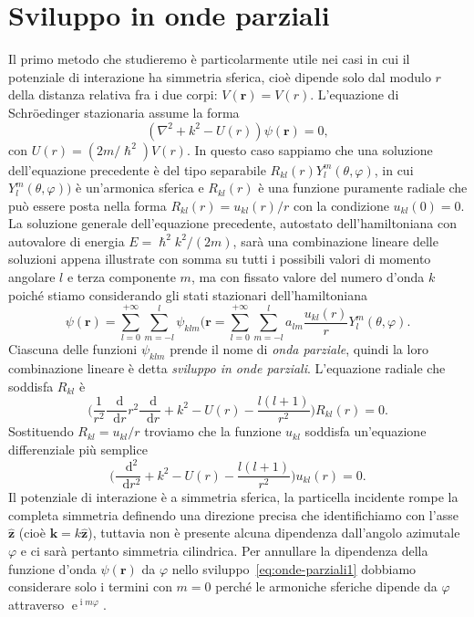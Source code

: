 \documentclass[a4paper,fleqn,twoside,12pt]{article}
\renewcommand{\phi}{\varphi}
\newcommand*{\dd}{\mathop{}\!\mathrm{d}} %
\DeclareMathOperator{\e}{\mathrm{e}} %
\DeclareMathOperator{\uimm}{\mathrm{i}} %
\newcommand*{\toder}[3][]{\frac{{\dd^{#1}}#2}{\dd {#3}^{#1}}}
\newcommand*{\versor}[1]{\hat{\bm{#1}}}
\begin{document}
\section{Sviluppo in onde parziali}
\label{sec:onde-parziali}

Il primo metodo che studieremo è particolarmente utile nei casi in cui il
potenziale di interazione ha simmetria sferica, cioè dipende solo dal modulo $r$
della distanza relativa fra i due corpi: $V(\bm{r}) = V(r)$.  L'equazione di
Schröedinger stazionaria assume la forma
\begin{equation}
  (\nabla^{2} + k^{2} - U(r)) \psi(\bm{r}) = 0,
\end{equation}
con $U(r) = (2m/\hslash^{2})V(r)$.  In questo caso sappiamo che una soluzione
dell'equazione precedente è del tipo separabile
$R_{kl}(r)Y_{l}^{m}(\theta,\phi)$, in cui $Y_{l}^{m}(\theta,\phi))$ è
un'armonica sferica e $R_{kl}(r)$ è una funzione puramente radiale che può
essere posta nella forma $R_{kl}(r) = u_{kl}(r)/r$ con la condizione
$u_{kl}(0) = 0$.  La soluzione generale dell'equazione precedente, autostato
dell'hamiltoniana con autovalore di energia $E = \hslash^{2}k^{2}/(2m)$, sarà
una combinazione lineare delle soluzioni appena illustrate con somma su tutti i
possibili valori di momento angolare $l$ e terza componente $m$, ma con fissato
valore del numero d'onda $k$ poiché stiamo considerando gli stati stazionari
dell'hamiltoniana
\begin{equation}
  \label{eq:onde-parziali1}
  \psi(\bm{r}) = \sum_{l = 0}^{+\infty} \sum_{m = -l}^{l} \psi_{klm}(\bm{r} =
  \sum_{l = 0}^{+\infty} \sum_{m = -l}^{l} a_{lm}
  \frac{u_{kl}(r)}{r}Y_{l}^{m}(\theta,\phi).
\end{equation}
Ciascuna delle funzioni $\psi_{klm}$ prende il nome di \emph{onda parziale},
quindi la loro combinazione lineare è detta \emph{sviluppo in onde parziali}.
L'equazione radiale che soddisfa $R_{kl}$ è
\begin{equation}
  \label{eq:diff-R-op}
  \bigg(\frac{1}{r^{2}}\toder{}{r}r^{2}\toder{}{r} + k^{2} - U(r) -
  \frac{l(l+1)}{r^{2}}\bigg)R_{kl}(r) = 0.
\end{equation}
Sostituendo $R_{kl}=u_{kl}/r$ troviamo che la funzione $u_{kl}$ soddisfa
un'equazione differenziale più semplice
\begin{equation}
  \bigg(\toder[2]{}{r} + k^{2} - U(r) - \frac{l(l+1)}{r^{2}}\bigg)u_{kl}(r) = 0.
\end{equation}
Il potenziale di interazione è a simmetria sferica, la particella incidente
rompe la completa simmetria definendo una direzione precisa che identifichiamo
con l'asse $\versor{z}$ (cioè $\bm{k} = k\versor{z}$), tuttavia non è presente
alcuna dipendenza dall'angolo azimutale $\phi$ e ci sarà pertanto simmetria
cilindrica.  Per annullare la dipendenza della funzione d'onda $\psi(\bm{r})$ da
$\phi$ nello sviluppo~\eqref{eq:onde-parziali1} dobbiamo considerare solo i
termini con $m = 0$ perché le armoniche sferiche dipende da $\phi$ attraverso
$\e^{\uimm m \phi}$.
\end{document}
